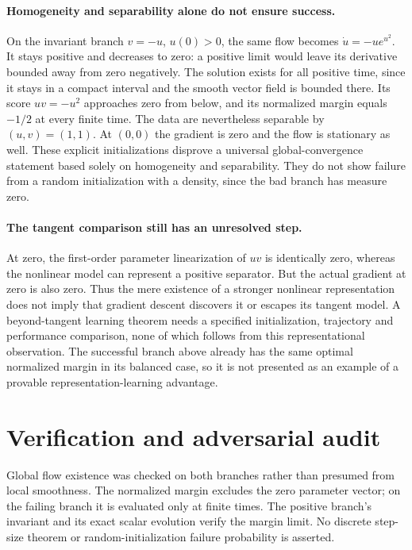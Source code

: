 \documentclass[11pt]{article}
\begin{document}
\paragraph{Homogeneity and separability alone do not ensure success.}
On the invariant branch $v=-u$, $u(0)>0$, the same flow becomes
$\dot u=-u e^{u^2}$. It stays positive and decreases to zero: a positive
limit would leave its derivative bounded away from zero negatively. The
solution exists for all positive time, since it stays in a compact interval and
the smooth vector field is bounded there. Its score $uv=-u^2$ approaches
zero from below, and its normalized margin equals $-1/2$ at every finite time.
The data are nevertheless separable by $(u,v)=(1,1)$.
At $(0,0)$ the gradient is zero and the flow is stationary as well.
These explicit initializations disprove a universal global-convergence statement
based solely on homogeneity and separability. They do not show failure from a
random initialization with a density, since the bad branch has measure zero.

\paragraph{The tangent comparison still has an unresolved step.}
At zero, the first-order parameter linearization of $uv$ is identically zero,
whereas the nonlinear model can represent a positive separator. But the actual
gradient at zero is also zero. Thus the mere existence of a stronger nonlinear
representation does not imply that gradient descent discovers it or escapes its
tangent model. A beyond-tangent learning theorem needs a specified initialization,
trajectory and performance comparison, none of which follows from this
representational observation. The successful branch above already has the same
optimal normalized margin in its balanced case, so it is not presented as an
example of a provable representation-learning advantage.

\section{Verification and adversarial audit}

Global flow existence was checked on both branches rather than presumed from
local smoothness. The normalized margin excludes the zero parameter vector;
on the failing branch it is evaluated only at finite times. The positive branch's
invariant and its exact scalar evolution verify the margin limit. No discrete
step-size theorem or random-initialization failure probability is asserted.
\end{document}
